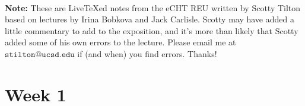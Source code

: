 \documentclass{book}
\begin{document}
    \maketitle

    ~
    \vspace{3in}
    \begin{center}
        \noindent \textbf{Note:} These are Live\TeX ed notes from the eCHT REU written by Scotty Tilton based on lectures by Irina Bobkova and Jack Carlisle. Scotty may have added a little commentary to add to the exposition, and it's more than likely that Scotty added some of his own errors to the lecture. Please email me at $\texttt{stilton@ucsd.edu}$ if (and when) you find errors. Thanks!
    \end{center}
    \tableofcontents
    \chapter{Week 1}
    
    
    \newpage
    
    
    \newpage
    
    
    \newpage
    
    \newpage
    
    \newpage
    

    \newpage
    
    \newpage
    \newpage
    
    
    \printindex
\end{document}
